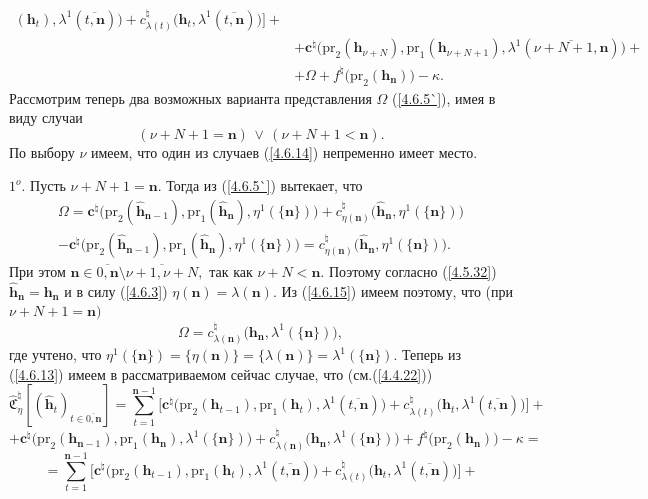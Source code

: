 \documentclass[11pt,twoside]{report}
\newcommand{\bfn}{\begin{equation}}
\newcommand{\efn}{\end{equation}}
\newcommand{\ov}{\overline}
\newcommand{\Om}{\Omega}
\newcommand{\la}{\lambda}
\newcommand{\zc}{{\mathbf c}}
\newcommand{\nn}{{\mathbf n}}
\begin{document}
{{\begin{eqnarray}
(\mathbf{h}_t),\la^1(\ov{t,\nn})\bigl)+ c_{\la(t)}^\natural\bigl(\mathbf{h}_t,\la^1(\ov{t,\nn})\bigl)\bigl] +
&\nonumber\\
&+\zc^\natural\bigl(\mathrm{pr}_2(\mathbf{h}_{\nu+N}),\mathrm{pr}_1(\mathbf{h}_{\nu+N+1}),
\la^1(\ov{\nu+N+1,\nn})\bigl)+
&\nonumber\\
&+\Om + f^\natural\bigl(\mathrm{pr}_2(\mathbf{h}_\nn)\bigl) -\kappa.
&\label{4.6.13}
\end{eqnarray}
 Рассмотрим теперь два возможных варианта представления $\Om$ (\ref{4.6.5`}), имея в виду случаи
 \bfn\label{4.6.14}(\nu+N+1 = \nn)\,\vee\,(\nu+N+ 1< \nn).
 \efn
 По выбору $\nu$ имеем, что один из случаев (\ref{4.6.14}) непременно имеет место.

 $1^o.$ Пусть $\nu+N+1 = \nn.$ Тогда из (\ref{4.6.5`}) вытекает, что
 \begin{eqnarray}
&\Om = \zc^\natural\bigl(\mathrm{pr}_2(\hat{\mathbf{h}}_{\nn-1}),\mathrm{pr}_1(\hat{\mathbf{h}}_\nn),
 \eta^1(\{\nn\})\bigl) + c_{\eta(\nn)}^\natural\bigl(\hat{\mathbf{h}}_\nn,\eta^1(\{\nn\})\bigl)
&\nonumber\\
&- \zc^\natural\bigl(\mathrm{pr}_2(\hat{\mathbf{h}}_{\nn-1}),\mathrm{pr}_1(\hat{\mathbf{h}}_\nn),
 \eta^1(\{\nn\})\bigl)=
 c_{\eta(\nn)}^\natural\bigl(\hat{\mathbf{h}}_\nn,\eta^1(\{\nn\})\bigl).
&\label{4.6.15}
\end{eqnarray}
При этом $\nn\in \ov{0,\nn}\setminus \ov{\nu+1,\nu+N},$ так как $\nu+N < \nn.$ Поэтому
согласно (\ref{4.5.32}) $\hat{\mathbf{h}}_\nn =\mathbf{h}_\nn$ и в силу (\ref{4.6.3})
$\eta(\nn) = \la(\nn).$ Из (\ref{4.6.15}) имеем поэтому, что (при $\nu+N+1 = \nn)$
$$\Om = c_{\la(\nn)}^\natural\bigl(\mathbf{h}_\nn,\la^1(\{\nn\})\bigl),
$$
где учтено, что $\eta^1(\{\nn\}) = \{\eta(\nn)\} = \{\la(\nn)\} = \la^1(\{\nn\}).$ Теперь из
(\ref{4.6.13}) имеем в рассматриваемом сейчас случае, что (см.(\ref{4.4.22}))
$$\widehat{\mathfrak{C}}_\eta^\natural[(\hat{\mathbf{h}}_t)_{t\in\ov{0,\nn}}]=
\sum\limits_{t=1}^{\nn-1}\bigl[\zc^\natural\bigl(\mathrm{pr}_2(\mathbf{h}_{t-1}),\mathrm{pr}_1
(\mathbf{h}_t),\la^1(\ov{t,\nn})\bigl)+ c_{\la(t)}^\natural\bigl(\mathbf{h}_t,\la^1(\ov{t,\nn})\bigl)\bigl] +
$$
$$+ \zc^\natural\bigl(\mathrm{pr}_2(\mathbf{h}_{\nn-1}),\mathrm{pr}_1
(\mathbf{h}_\nn),\la^1(\{\nn\})\bigl)+ c_{\la(\nn)}^\natural\bigl(\mathbf{h}_\nn,\la^1(\{\nn\})\bigl) +
f^\natural\bigl(\mathrm{pr}_2(\mathbf{h}_\nn)\bigl) -\kappa = $$
$$= \sum\limits_{t=1}^{\nn-1}\bigl[\zc^\natural\bigl(\mathrm{pr}_2(\mathbf{h}_{t-1}),\mathrm{pr}_1
(\mathbf{h}_t),\la^1(\ov{t,\nn})\bigl)+ c_{\la(t)}^\natural\bigl(\mathbf{h}_t,\la^1(\ov{t,\nn})\bigl)\bigl] +
$$}}
\end{document}
